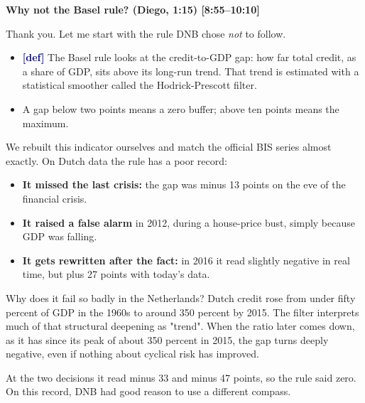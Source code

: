 {\small\textbf{Why not the Basel rule? (Diego, 1:15) [8:55–10:10]}}\par\smallskip
Thank you. Let me start with the rule DNB chose \emph{not} to follow.
\begin{itemize}\setlength\itemsep{0pt}
\item \textcolor{navy}{\textbf{[def]}} The Basel rule looks at the credit-to-GDP gap: how far total credit, as a share of GDP, sits above its long-run trend. That trend is estimated with a statistical smoother called the Hodrick-Prescott filter.
\item A gap below two points means a zero buffer; above ten points means the maximum.
\end{itemize}
\par\smallskip
We rebuilt this indicator ourselves and match the official BIS series almost exactly. On Dutch data the rule has a poor record:
\begin{itemize}\setlength\itemsep{0pt}
\item \textbf{It missed the last crisis:} the gap was minus 13 points on the eve of the financial crisis.
\item \textbf{It raised a false alarm} in 2012, during a house-price bust, simply because GDP was falling.
\item \textbf{It gets rewritten after the fact:} in 2016 it read slightly negative in real time, but plus 27 points with today's data.
\end{itemize}
\par\smallskip
Why does it fail so badly in the Netherlands? Dutch credit rose from under fifty percent of GDP in the 1960s to around 350 percent by 2015. The filter interprets much of that structural deepening as "trend". When the ratio later comes down, as it has since its peak of about 350 percent in 2015, the gap turns deeply negative, even if nothing about cyclical risk has improved.
\par\smallskip
At the two decisions it read minus 33 and minus 47 points, so the rule said zero. On this record, DNB had good reason to use a different compass.
